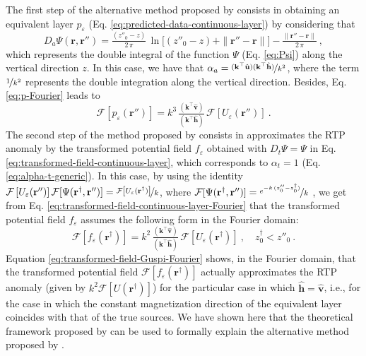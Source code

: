 The first step of the alternative method proposed by \cite{guspi_novara2009} consists in obtaining an equivalent layer 
$p_{\varepsilon}$ (Eq. \ref{eq:predicted-data-continuous-layer}) by considering that
\begin{equation}
	D_{a}\Psi(\mathbf{r}, \mathbf{r}'') = \tfrac{\left( z''_{0} - z \right)}{2 \, \pi} \, 
	\ln{\Big[} \left( z''_{0} - z \right) + \| \mathbf{r}'' - \mathbf{r} \| {\Big]} - 
	\tfrac{\| \mathbf{r}'' - \mathbf{r} \|}{2 \, \pi} \: ,
	\label{eq:kernel-Fourier-Guspi}
\end{equation}
which represents the double integral of the function $\Psi$ (Eq. \ref{eq:Psi}) along the vertical direction $z$.
In this case, we have that $\alpha_{a} = \nicefrac{(\mathbf{k}^{\top} \hat{\mathbf{u}}) (\mathbf{k}^{\top} \hat{\mathbf{h}})}{k^{2}}$, 
where the term $\nicefrac{1}{k^{2}}$ represents the double integration along the vertical direction. 
Besides, Eq. \ref{eq:p-Fourier} leads to
\begin{equation}
	\mathcal{F} [ p_{\varepsilon}(\mathbf{r}'') ] =
	k^{3} \, \tfrac{\left(\mathbf{k}^{\top} \hat{\mathbf{v}} \right)}{\left(\mathbf{k}^{\top} \hat{\mathbf{h}} \right)} \,
	\mathcal{F} \left[ U_{\varepsilon}(\mathbf{r}'') \right] \: .
	\label{eq:p-Fourier-guspi}
\end{equation}
The second step of the method proposed by \cite{guspi_novara2009} consists in approximates the RTP anomaly by
the transformed potential field $f_{\varepsilon}$ obtained with $D_{t}\Psi = \Psi$ in Eq. 
\ref{eq:transformed-field-continuous-layer}, which corresponds to $\alpha_{t} = 1$ (Eq. \ref{eq:alpha-t-generic}).
In this case, by using the identity 
$\mathcal{F} \left[ U_{\varepsilon}(\mathbf{r}'') \right] \mathcal{F} [ \Psi(\mathbf{r}^{\dagger}, \mathbf{r}'') ] = 
\nicefrac{\mathcal{F} \left[ U_{\varepsilon}(\mathbf{r}^{\dagger}) \right]}{k}$, where 
$\mathcal{F} [ \Psi(\mathbf{r}^{\dagger}, \mathbf{r}'') ] = \nicefrac{e^{-k \, (z''_{0} - z^{\dagger}_{0})}}{k}$ 
\citep[e.g.,][p. 275]{blakely1996}, 
we get from Eq. \ref{eq:transformed-field-continuous-layer-Fourier}
that the transformed potential field $f_{\varepsilon}$ assumes the following form in the Fourier domain:
\begin{equation}
	\mathcal{F} [ f_{\varepsilon}(\mathbf{r}^{\dagger}) ] =
	k^{2} \, \tfrac{\left(\mathbf{k}^{\top} \hat{\mathbf{v}} \right)}{\left(\mathbf{k}^{\top} \hat{\mathbf{h}} \right)}
	\, \mathcal{F} \left[ U_{\varepsilon}(\mathbf{r}^{\dagger}) \right] \: , 
	\quad z^{\dagger}_{0} < z''_{0} \: .
	\label{eq:transformed-field-Guspi-Fourier}
\end{equation}
Equation \ref{eq:transformed-field-Guspi-Fourier} shows, in the Fourier domain, that the transformed potential field 
$\mathcal{F} [ f_{\varepsilon}(\mathbf{r}^{\dagger}) ]$ actually approximates the RTP anomaly 
(given by $k^{2} \mathcal{F} \left[ U(\mathbf{r}^{\dagger}) \right]$) for the particular case in which 
$\hat{\mathbf{h}} = \hat{\mathbf{v}}$, i.e., for the case in which the constant magnetization direction of 
the equivalent layer coincides with that of the true sources.
We have shown here that the theoretical framework proposed by \cite{oliveirajr_etal2026_1} can be used to formally 
explain the alternative method proposed by \cite{guspi_novara2009}.
